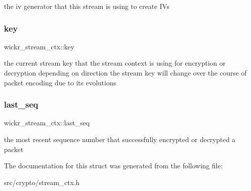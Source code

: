 the iv generator that this stream is using to create I\+Vs \mbox{\label{structwickr__stream__ctx_a3598b3c0415d13fafab6633f8c00a3c8}} 
\subsubsection{\texorpdfstring{key}{key}}
{\footnotesize\ttfamily wickr\+\_\+stream\+\_\+ctx\+::key}

the current stream key that the stream context is using for encryption or decryption depending on direction the stream key will change over the course of packet encoding due to it\textquotesingle{}s evolutions \mbox{\label{structwickr__stream__ctx_abf2c6ab54e1663e6a47e310fd68b3b3f}} 
\subsubsection{\texorpdfstring{last\+\_\+seq}{last\_seq}}
{\footnotesize\ttfamily wickr\+\_\+stream\+\_\+ctx\+::last\+\_\+seq}

the most recent sequence number that successfully encrypted or decrypted a packet 

The documentation for this struct was generated from the following file\+:\begin{DoxyCompactItemize}
\item 
src/crypto/stream\+\_\+ctx.\+h\end{DoxyCompactItemize}
